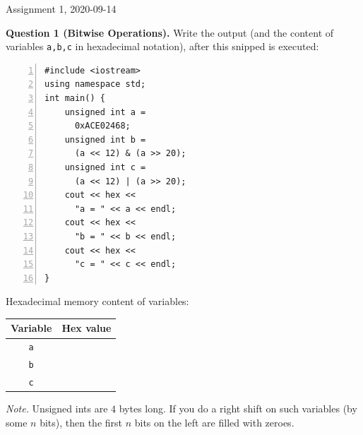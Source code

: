 \documentclass[11pt]{article}
\begin{document}
\thispagestyle{empty}

\twocolumn


\begin{center}
{\Large Assignment 1, 2020-09-14}
\end{center}



{\bf Question 1 (Bitwise Operations).} Write the output
(and the content of variables {\tt a,b,c} in hexadecimal notation),
after this snipped is executed:



\begin{center}
\begin{minipage}{.8\columnwidth}
\begin{Verbatim}[frame=single,numbers=left]
#include <iostream>
using namespace std;
int main() {
    unsigned int a = 
      0xACE02468;
    unsigned int b = 
      (a << 12) & (a >> 20);
    unsigned int c = 
      (a << 12) | (a >> 20);
    cout << hex << 
      "a = " << a << endl;
    cout << hex << 
      "b = " << b << endl;
    cout << hex << 
      "c = " << c << endl;
}
\end{Verbatim}
\end{minipage}
\end{center}

Hexadecimal memory content of variables:


\begin{tabular}{|c|c|} \hline
{\bf Variable} & {\bf Hex value} \\ \hline
{\tt \LARGE a} & \mbox{}\hspace{150pt}\mbox{} \\[20pt] \hline
{\tt \LARGE b} & \\[20pt] \hline
{\tt \LARGE c} & \\[20pt] \hline
\end{tabular}

{\em Note.} Unsigned ints are $4$ bytes long. 
If you do a right shift on 
such variables (by some $n$ bits), then the first $n$ bits 
on the left are filled with zeroes.
\end{document}
